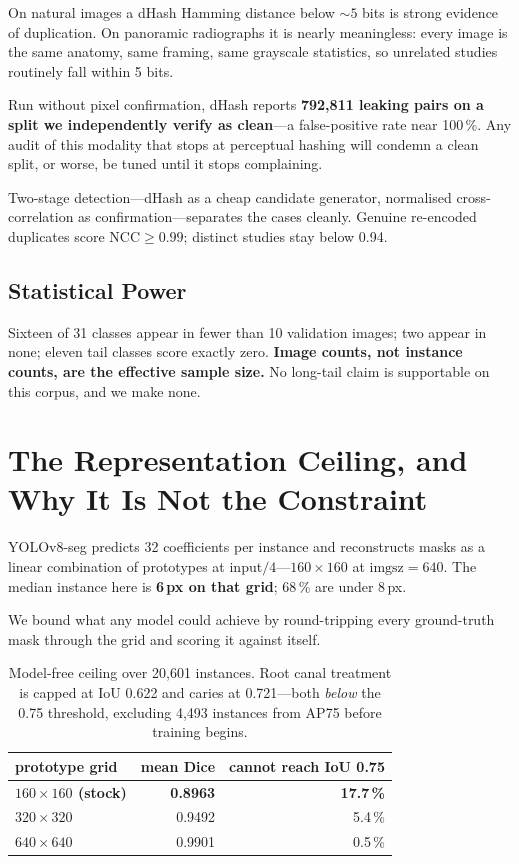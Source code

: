 \documentclass[10pt,twocolumn,letterpaper]{article}
\begin{document}
On natural images a dHash Hamming distance below ${\sim}5$ bits is strong
evidence of duplication. On panoramic radiographs it is nearly meaningless:
every image is the same anatomy, same framing, same grayscale statistics, so
unrelated studies routinely fall within 5 bits.

Run without pixel confirmation, dHash reports \textbf{792{,}811 leaking pairs on
a split we independently verify as clean}---a false-positive rate near 100\,\%.
Any audit of this modality that stops at perceptual hashing will condemn a clean
split, or worse, be tuned until it stops complaining.

Two-stage detection---dHash as a cheap candidate generator, normalised
cross-correlation as confirmation---separates the cases cleanly. Genuine
re-encoded duplicates score $\mathrm{NCC}\ge0.99$; distinct studies stay below
0.94.

\subsection{Statistical Power}

Sixteen of 31 classes appear in fewer than 10 validation images; two appear in
none; eleven tail classes score exactly zero. \textbf{Image counts, not instance
counts, are the effective sample size.} No long-tail claim is supportable on
this corpus, and we make none.

\section{The Representation Ceiling, and Why It Is Not the Constraint}
\label{sec:ceiling}

YOLOv8-seg predicts 32 coefficients per instance and reconstructs masks as a
linear combination of prototypes at input$/4$---$160\times160$ at
$\mathrm{imgsz}=640$. The median instance here is \textbf{6\,px on that grid};
68\,\% are under 8\,px.

We bound what any model could achieve by round-tripping every ground-truth mask
through the grid and scoring it against itself.

\begin{table}[t]
\centering\small
\begin{tabular}{lrr}
\toprule
prototype grid & mean Dice & cannot reach IoU 0.75 \\
\midrule
\textbf{$160\times160$ (stock)} & \textbf{0.8963} & \textbf{17.7\,\%} \\
$320\times320$ & 0.9492 & 5.4\,\% \\
$640\times640$ & 0.9901 & 0.5\,\% \\
\bottomrule
\end{tabular}
\caption{Model-free ceiling over 20{,}601 instances. Root canal treatment is
capped at IoU 0.622 and caries at 0.721---both \emph{below} the 0.75
threshold, excluding 4{,}493 instances from AP75 before training begins.}
\end{table}
\end{document}
